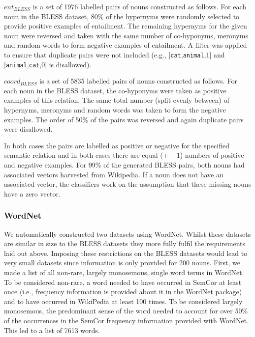 \documentclass[11pt]{article}
\begin{document}
$ent_{BLESS}$ is a set of 1976 labelled pairs of nouns constructed as follows.  For each noun in the BLESS dataset, 80\% of the hypernyms were randomly selected to provide positive examples of entailment.  The remaining hypernyms for the given noun were reversed and taken with the same number of co-hyponyms, meronyms and random words to form negative examples of entailment.  A filter was applied to ensure that duplicate pairs were not included (e.g., [\texttt{cat},\texttt{animal},1] and [\texttt{animal},\texttt{cat},0] is disallowed). 

$coord_{BLESS}$ is a set of 5835 labelled pairs of nouns constructed as follows.  For each noun in the BLESS dataset, the co-hyponyms were taken as positive examples of this relation.  The same total number (split evenly between) of hypernyms, meronyms and random words was taken to form the negative examples.  The order of 50\% of the pairs was reversed and again duplicate pairs were disallowed. 

In both cases the pairs are labelled as positive or negative for the specified semantic relation and in both cases there are equal ($+-1$) numbers of positive and negative examples.  For 99\% of the generated BLESS pairs, both nouns had associated vectors harvested from Wikipedia.  If a noun does not have an associated vector, the classifiers work on the assumption that these missing nouns have a zero vector.  

\subsubsection{WordNet}

We automatically constructed two datasets using WordNet.  Whilst these datasets are similar in size to the BLESS datasets they more fully fulfil the requirements laid out above.  Imposing these restrictions on the BLESS datasets would lead to very small datasets since information is only provided for 200 nouns.  First, we made a list of all non-rare, largely monosemous, single word terms in WordNet.  To be considered non-rare, a word needed to have occurred in SemCor at least once (i.e., frequency information is provided about it in the WordNet package) and to have occurred in WikiPedia at least 100 times.  To be considered largely monosemous, the predominant sense of the word needed to account for over 50\% of the occurrences in the SemCor frequency information provided with WordNet.  This led to a list of 7613 words. 
\end{document}
